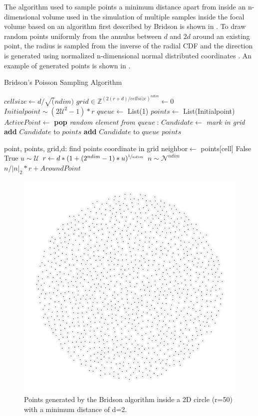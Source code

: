 The algorithm used to sample points a minimum distance apart from inside an n-dimensional volume used in the simulation of multiple samples inside the focal volume based on an algorithm first described by Bridson is shown in  \cite{bridson}. To draw random points uniformly from the annulus between $d$ and $2d$ around an existing point, the radius is sampled from the inverse of the radial CDF and the direction is generated using normalized n-dimensional normal distributed coordinates \cite{muller1959}.
An example of generated points is shown in .
\begin{algorithm}
	\caption{Bridson's Poisson Sampling Algorithm}\label{algo:bridson}
	\begin{algorithmic}
			\State $cellsize \gets d / \sqrt(ndim)$
			\State $grid \in \mathbb{Z}^{{{(2(r+d)/cellsize)}^{ndim}}} \gets 0$
			\State $Initialpoint \sim (2\mathcal{U}^2-1)*r$
			\State $queue \gets$ List(1)
			\State $points \gets$ List(Initialpoint)
				\State $ActivePoint \gets$ \textbf{pop} \textit{random element from queue}
				:
					\State $Candidate \gets$
						\State \textit{mark in grid}
						\State \textbf{add} $Candidate$ to $points$
						\State \textbf{add} $Candidate$ to $queue$
					\EndIf
				\EndLoop
			\EndWhile
			\State \Return $points$
		\EndFunction
		
		 {point, points, grid,d}:
			\State find points coordinate in grid
					\State neighbor$\gets$ points[cell]
					 	\State \Return False 
					 \EndIf
				\EndIf
			\EndFor
			\State \Return True
		\EndFunction
			\State $u \sim \mathcal{U}$
			\State $r \gets d * (1 + (2 ^ {ndim} - 1) * u) ^ {\sfrac{1}{ndim}}$
			\State $n \sim \mathcal{N}^{ndim}$
			\State \Return  $n/|n|_2 * r + AroundPoint$
		\EndFunction
	\end{algorithmic}
\end{algorithm}

\begin{figure}[H]
	\centering
	\includegraphics[width=0.4\linewidth]{images/bridson.pdf}
	\caption[Points generated by the Bridson algorithm inside a 2D circle]{Points generated by the Bridson algorithm inside a 2D circle (r=50) with a minimum distance of d=2.}
	\label{fig:bridson}
\end{figure}



